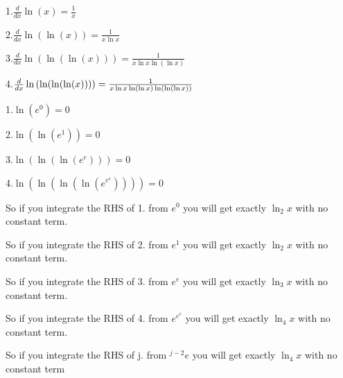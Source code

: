 \documentclass{article}
\begin{document}
1.$\frac{d}{dx}\ln (x)=\allowbreak \frac{1}{x}$

2.$\frac{d}{dx}\ln (\ln (x))=\allowbreak \frac{1}{x\ln x}$

3.$\frac{d}{dx}\ln (\ln (\ln (x)))=\allowbreak \frac{1}{x\ln x\ln \left( \ln
x\right) }$

4.$\frac{d}{dx}\ln \left( \ln (\ln (\ln (x)))\right) =\allowbreak \frac{1}{%
x\ln x\ln \left( \ln x\right) \ln \left( \ln \left( \ln x\right) \right) }$

1.$\ln \left( e^{0}\right) =0$

2.$\ln (\ln (e^{1}))=\allowbreak 0$

3.$\ln (\ln (\ln (e^{e})))=0$

4.$\ln \left( \ln (\ln (\ln (e^{e^{e}})))\right) =0$

\bigskip 

So if you integrate the RHS of 1. from $e^{0}$ you will get exactly $\ln
_{2}x$ with no constant term.

So if you integrate the RHS of 2. from $e^{1}$ you will get exactly $\ln
_{2}x$ with no constant term.

So if you integrate the RHS of 3. from $e^{e}$ you will get exactly $\ln
_{3}x$ with no constant term.

So if you integrate the RHS of 4. from $e^{e^{e}}$ you will get exactly $\ln
_{4}x$ with no constant term.

So if you integrate the RHS of j. from $^{j-2}e$ you will get exactly $\ln
_{4}x$ with no constant term
\end{document}
